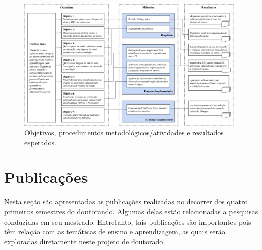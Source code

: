 \begin{figure}
\caption{Objetivos, procedimentos metodológicos/atividades e resultados esperados.}
\label{proposal:figure:objectives-methods-results}
\centerline{\includegraphics[width=\textwidth]{images/objectives-methods-results.pdf}}
\fautor
\end{figure}

\section{Publicações}

Nesta seção são apresentadas as publicações realizadas no decorrer dos quatro primeiros semestres do doutorando. Algumas delas estão relacionadas a pesquisas conduzidas em seu mestrado. Entretanto, tais publicações são importantes pois têm relação com as temáticas de ensino e aprendizagem, as quais serão exploradas diretamente neste projeto de doutorado.


